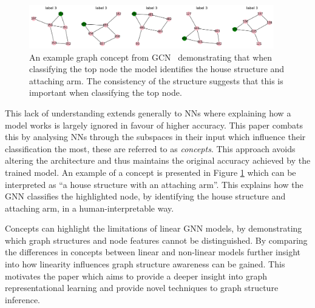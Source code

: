 \begin{figure}[h]
    \centering
    \captionsetup{width=0.9\textwidth}
    \includegraphics[width=0.95\textwidth]{figures/concept}
    \caption{An example graph concept from GCN~\cite{kipf2016semi} demonstrating that when classifying the top node the model identifies the house structure and attaching arm. The consistency of the structure suggests that this is important when classifying the top node.}
    \label{fig:concept}
\end{figure}


This lack of understanding extends generally to NNs where explaining how a model works is largely ignored in favour of higher accuracy.
This paper combats this by analysing NNs through the subspaces in their input which influence their classification the most, these are referred to as \emph{concepts}.
This approach avoids altering the architecture and thus maintains the original accuracy achieved by the trained model.
An example of a concept is presented in Figure \ref{fig:concept} which can be interpreted as ``a house structure with an attaching arm''.
This explains how the GNN classifies the highlighted node, by identifying the house structure and attaching arm, in a human-interpretable way.

Concepts can highlight the limitations of linear GNN models, by demonstrating which graph structures and node features cannot be distinguished.
By comparing the differences in concepts between linear and non-linear models further insight into how linearity influences graph structure awareness can be gained. 
This motivates the paper which aims to provide a deeper insight into graph representational learning and provide novel techniques to graph structure inference.

